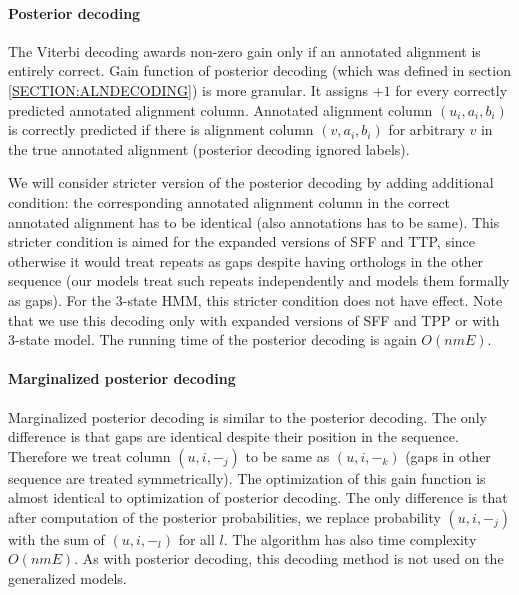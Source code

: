 \paragraph{Posterior decoding}
The Viterbi decoding awards non-zero gain only if an annotated alignment is
entirely correct. Gain function of posterior decoding (which was defined
in section \ref{SECTION:ALNDECODING}) is more granular. It assigns $+1$ for
every correctly predicted annotated alignment column. Annotated alignment
column $(u_i, a_i, b_i)$ is correctly predicted if there is alignment column
$(v, a_i, b_i)$ for arbitrary $v$ in the true annotated alignment (posterior
decoding ignored labels). 

We will consider stricter version of the posterior decoding by adding
additional condition: the corresponding annotated alignment column in the
correct annotated alignment has to be identical (also annotations has to be
same).  This stricter condition is aimed for the expanded versions of SFF and
TTP, since otherwise it would treat repeats as gaps despite having orthologs in
the other sequence (our models treat such repeats independently and models them
formally as gaps).  For the 3-state HMM, this stricter condition does not have
effect. Note that we use this decoding only with expanded versions of SFF and
TPP or with 3-state model.  The running time of the posterior decoding is again
$O(nmE)$.

\paragraph{Marginalized posterior decoding}
Marginalized posterior decoding is similar to the posterior decoding. The only
difference is that gaps are identical despite their position in the sequence.
Therefore we treat column $(u, i, -_j)$ to be same as $(u, i, -_k)$ (gaps in
other sequence are treated symmetrically). The optimization of this gain
function is almost identical to optimization of posterior decoding. The only
difference is that after computation of the posterior probabilities, we replace
probability $(u, i, -_j)$ with the sum of $(u, i, -_l)$ for all $l$. The
algorithm has also time complexity $O(nmE)$.  As with posterior decoding, this
decoding method is not used on the generalized models.

